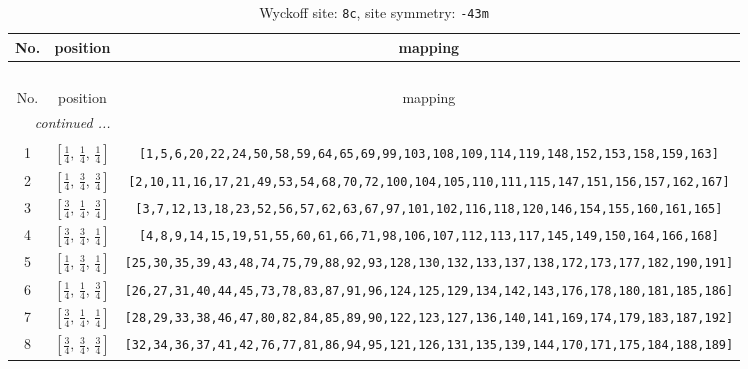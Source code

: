 \documentclass[fleqn,8pt]{jsarticle}
\begin{document}
\begin{longtable}{ccc}
\caption{Wyckoff site: {\tt 8c}, site symmetry: {\tt -43m}}
 \\
 \hline \hline
No. & position & mapping \\ \hline \endfirsthead

\multicolumn{2}{l}{\tablename\ \thetable{}} \\
 \hline \hline
No. & position & mapping \\ \hline \endhead

 \hline \hline
\multicolumn{2}{r}{\footnotesize\it continued ...} \\ \endfoot

 \hline \hline
\multicolumn{2}{r}{} \\ \endlastfoot

1 & $\left[ \frac{1}{4},\, \frac{1}{4},\, \frac{1}{4} \right]$ & {\tt [1,5,6,20,22,24,50,58,59,64,65,69,99,103,108,109,114,119,148,152,153,158,159,163]} \\ \hline
2 & $\left[ \frac{1}{4},\, \frac{3}{4},\, \frac{3}{4} \right]$ & {\tt [2,10,11,16,17,21,49,53,54,68,70,72,100,104,105,110,111,115,147,151,156,157,162,167]} \\ \hline
3 & $\left[ \frac{3}{4},\, \frac{1}{4},\, \frac{3}{4} \right]$ & {\tt [3,7,12,13,18,23,52,56,57,62,63,67,97,101,102,116,118,120,146,154,155,160,161,165]} \\ \hline
4 & $\left[ \frac{3}{4},\, \frac{3}{4},\, \frac{1}{4} \right]$ & {\tt [4,8,9,14,15,19,51,55,60,61,66,71,98,106,107,112,113,117,145,149,150,164,166,168]} \\ \hline
5 & $\left[ \frac{1}{4},\, \frac{3}{4},\, \frac{1}{4} \right]$ & {\tt [25,30,35,39,43,48,74,75,79,88,92,93,128,130,132,133,137,138,172,173,177,182,190,191]} \\ \hline
6 & $\left[ \frac{1}{4},\, \frac{1}{4},\, \frac{3}{4} \right]$ & {\tt [26,27,31,40,44,45,73,78,83,87,91,96,124,125,129,134,142,143,176,178,180,181,185,186]} \\ \hline
7 & $\left[ \frac{3}{4},\, \frac{1}{4},\, \frac{1}{4} \right]$ & {\tt [28,29,33,38,46,47,80,82,84,85,89,90,122,123,127,136,140,141,169,174,179,183,187,192]} \\ \hline
8 & $\left[ \frac{3}{4},\, \frac{3}{4},\, \frac{3}{4} \right]$ & {\tt [32,34,36,37,41,42,76,77,81,86,94,95,121,126,131,135,139,144,170,171,175,184,188,189]} \\
\end{longtable}
\renewcommand{\arraystretch}{1.2}
\end{document}
